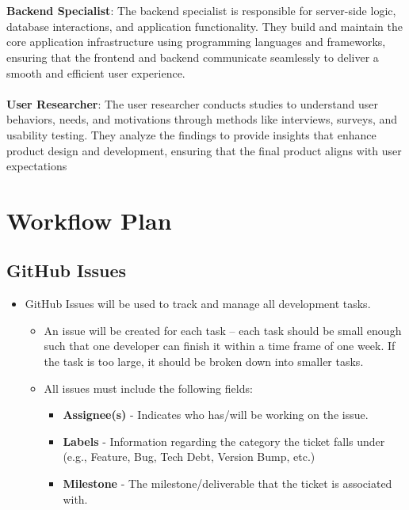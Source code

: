 \documentclass{article}
\begin{document}
\\
\\
\textbf{Backend Specialist}: The backend specialist is responsible for server-side logic, database interactions, and application functionality. They build and maintain the core application infrastructure using programming languages and frameworks, ensuring that the frontend and backend communicate seamlessly to deliver a smooth and efficient user experience.
\\
\\
\textbf{User Researcher}: The user researcher conducts studies to understand user behaviors, needs, and motivations through methods like interviews, surveys, and usability testing. They analyze the findings to provide insights that enhance product design and development, ensuring that the final product aligns with user expectations

\newpage

\section{Workflow Plan}

\subsection{GitHub Issues}
\begin{itemize}
    \item GitHub Issues will be used to track and manage all development tasks.
    \begin{itemize}
        \item An issue will be created for each task -- each task should be small enough such that one developer can finish it within a time frame of one week. If the task is too large, it should be broken down into smaller tasks.
        \item All issues must include the following fields:
        \begin{itemize}
            \item \textbf{Assignee(s)} - Indicates who has/will be working on the issue.
            \item \textbf{Labels} - Information regarding the category the ticket falls under (e.g., Feature, Bug, Tech Debt, Version Bump, etc.)
            \item \textbf{Milestone} - The milestone/deliverable that the ticket is associated with.
        \end{itemize}
    \end{itemize}
\end{itemize}
\end{document}
